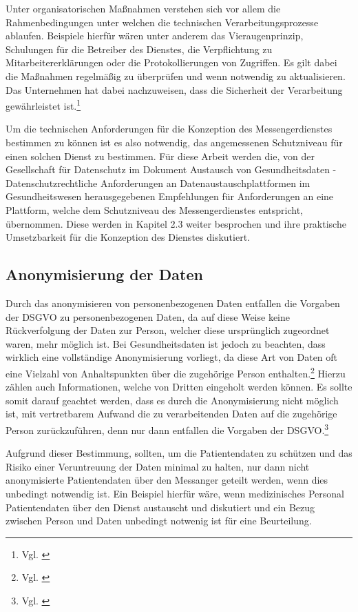 Unter organisatorischen Maßnahmen verstehen sich vor allem die Rahmenbedingungen unter welchen die technischen Verarbeitungsprozesse ablaufen. Beispiele hierfür wären unter anderem das Vieraugenprinzip, Schulungen für die Betreiber des Dienstes, die Verpflichtung zu Mitarbeitererklärungen oder die Protokollierungen von Zugriffen. Es gilt dabei die Maßnahmen regelmäßig zu überprüfen und wenn notwendig zu aktualisieren. Das Unternehmen hat dabei nachzuweisen, dass die Sicherheit der Verarbeitung gewährleistet ist.\footnote{Vgl. \cite[S. 42 ff.]{Bundesaerztekammer2020}}

Um die technischen Anforderungen für die Konzeption des Messengerdienstes bestimmen zu können ist es also notwendig, das angemessenen Schutzniveau für einen solchen Dienst zu bestimmen. Für diese Arbeit werden die, von der Gesellschaft für Datenschutz im Dokument \glqq Austausch von Gesundheitsdaten -  Datenschutzrechtliche Anforderungen an Datenaustauschplattformen im Gesundheitswesen\grqq{} herausgegebenen Empfehlungen für Anforderungen an eine Plattform, welche dem Schutzniveau des Messengerdienstes entspricht, übernommen. Diese werden in Kapitel 2.3 weiter besprochen und ihre praktische Umsetzbarkeit für die Konzeption des Dienstes diskutiert. 


\subsection{Anonymisierung der Daten}\label{subsection:add}
Durch das anonymisieren von personenbezogenen Daten entfallen die Vorgaben der DSGVO zu personenbezogenen Daten, da auf diese Weise keine Rückverfolgung der Daten zur Person, welcher diese ursprünglich zugeordnet waren, mehr möglich ist. Bei Gesundheitsdaten ist jedoch zu beachten, dass wirklich eine vollständige Anonymisierung vorliegt, da diese Art von Daten oft eine Vielzahl von Anhaltspunkten über die zugehörige Person enthalten.\footnote{Vgl. \cite[S. 429 ff.]{Voigt2018}}
Hierzu zählen auch Informationen, welche von Dritten eingeholt werden können. Es sollte somit darauf geachtet werden, dass es durch die Anonymisierung nicht möglich ist, mit vertretbarem Aufwand die zu verarbeitenden Daten auf die zugehörige Person zurückzuführen, denn nur dann entfallen die Vorgaben der DSGVO.\footnote{Vgl. \cite[S. 5 f.]{Bundesaerztekammer2020}}

Aufgrund dieser Bestimmung, sollten, um die Patientendaten zu schützen und das Risiko einer Veruntreuung der Daten minimal zu halten, nur dann nicht anonymisierte Patientendaten über den Messanger geteilt werden, wenn dies unbedingt notwendig ist. Ein Beispiel hierfür wäre, wenn medizinisches Personal Patientendaten über den Dienst austauscht und diskutiert und ein Bezug zwischen Person und Daten unbedingt notwenig ist für eine Beurteilung.

